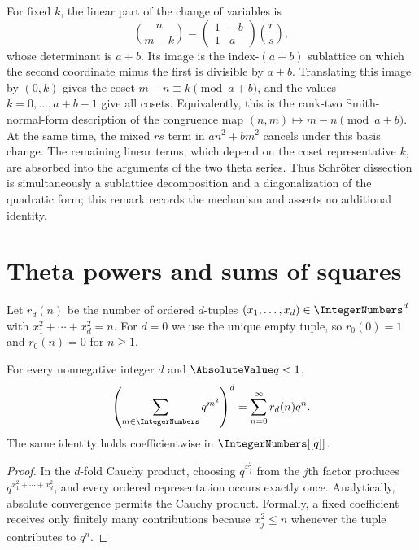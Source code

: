 \begin{remark}
For fixed $k$, the linear part of the change of variables is
\[
 \binom{n}{m-k}
 =\begin{pmatrix}1&-b\\1&a\end{pmatrix}\binom{r}{s},
\]
whose determinant is $a+b$.  Its image is the index-$(a+b)$ sublattice on
which the second coordinate minus the first is divisible by $a+b$.
Translating this image by $(0,k)$ gives the coset
$m-n\equiv k\pmod{a+b}$, and the values $k=0,\ldots,a+b-1$ give all cosets.
Equivalently, this is the rank-two Smith-normal-form description of the
congruence map $(n,m)\mapsto m-n\pmod{a+b}$.  At the same time, the mixed
$rs$ term in
$an^2+bm^2$ cancels under this basis change.  The remaining linear terms,
which depend on the coset representative $k$, are absorbed into the arguments
of the two theta series.  Thus Schr\"oter dissection is simultaneously a
sublattice decomposition and a diagonalization of the quadratic form; this
remark records the mechanism and asserts no additional identity.
\end{remark}

\section{Theta powers and sums of squares}

Let $r_d(n)$ be the number of ordered $d$-tuples
$(x_1,\ldots,x_d)\in\IntegerNumbers^d$ with
$x_1^2+\cdots+x_d^2=n$.
For $d=0$ we use the unique empty tuple, so
$r_0(0)=1$ and $r_0(n)=0$ for $n\ge1$.

\begin{proposition}
\label{qg:prop-squares-theta}
For every nonnegative integer $d$ and $\AbsoluteValue q<1$,
\begin{equation}
 \left(\sum_{m\in\IntegerNumbers}q^{m^2}\right)^d
 =\sum_{n=0}^{\infty}r_d(n)q^n.
\label{eq:qg-squares-theta}
\end{equation}
The same identity holds coefficientwise in $\IntegerNumbers[[q]]$.
\end{proposition}

\begin{proof}
In the $d$-fold Cauchy product, choosing $q^{x_j^2}$ from the $j$th factor
produces $q^{x_1^2+\cdots+x_d^2}$, and every ordered representation occurs
exactly once.  Analytically, absolute convergence permits the Cauchy product.
Formally, a fixed coefficient receives only finitely many contributions because
$x_j^2\le n$ whenever the tuple contributes to $q^n$.
\end{proof}

